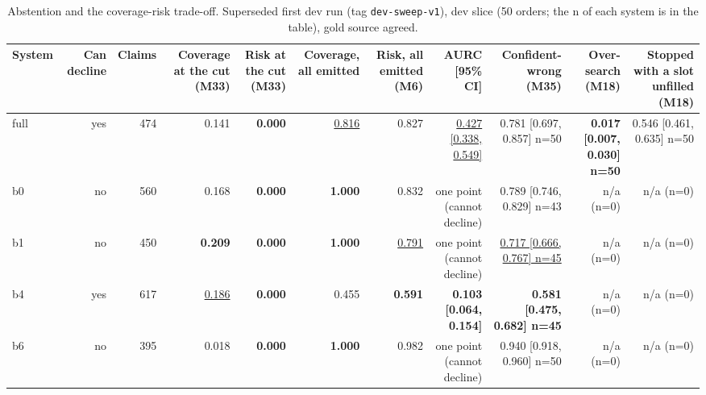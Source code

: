 \begin{table}[t]
\centering
\small
\caption{Abstention and the coverage-risk trade-off. Superseded first dev run (tag \texttt{dev-sweep-v1}), dev slice (50 orders; the n of each system is in the table), gold source agreed.}
\label{tab:table_abstention}
\begin{adjustbox}{max width=\textwidth}
\begin{tabular}{lrrrrrrrrrr}
\toprule
System & Can decline & Claims & Coverage at the cut (M33) & Risk at the cut (M33) & Coverage, all emitted & Risk, all emitted (M6) & AURC [95\% CI] & Confident-wrong (M35) & Over-search (M18) & Stopped with a slot unfilled (M18) \\
\midrule
full & yes & 474 & 0.141 & \textbf{0.000} & \underline{0.816} & 0.827 & \underline{0.427 [0.338, 0.549]} & 0.781 [0.697, 0.857] n=50 & \textbf{0.017 [0.007, 0.030] n=50} & 0.546 [0.461, 0.635] n=50 \\
b0 & no & 560 & 0.168 & \textbf{0.000} & \textbf{1.000} & 0.832 & one point (cannot decline) & 0.789 [0.746, 0.829] n=43 & n/a (n=0) & n/a (n=0) \\
b1 & no & 450 & \textbf{0.209} & \textbf{0.000} & \textbf{1.000} & \underline{0.791} & one point (cannot decline) & \underline{0.717 [0.666, 0.767] n=45} & n/a (n=0) & n/a (n=0) \\
b4 & yes & 617 & \underline{0.186} & \textbf{0.000} & 0.455 & \textbf{0.591} & \textbf{0.103 [0.064, 0.154]} & \textbf{0.581 [0.475, 0.682] n=45} & n/a (n=0) & n/a (n=0) \\
b6 & no & 395 & 0.018 & \textbf{0.000} & \textbf{1.000} & 0.982 & one point (cannot decline) & 0.940 [0.918, 0.960] n=50 & n/a (n=0) & n/a (n=0) \\
\bottomrule
\end{tabular}
\end{adjustbox}
\end{table}
